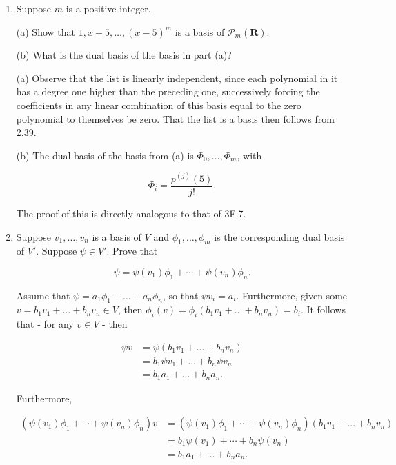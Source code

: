 \documentclass{book}
\begin{document}
\begin{enumerate}
\item Suppose \(m\) is a positive integer.

(a) Show that \(1,x-5,\dots,(x-5)^m\) is a basis of \(\mathcal{P}_m(\textbf{R})\).

(b) What is the dual basis of the basis in part (a)?

(a) Observe that the list is linearly independent, since each polynomial in it has a degree one higher than the preceding one, successively forcing the coefficients in any linear combination of this basis equal to the zero polynomial to themselves be zero.  That the list is a basis then follows from 2.39.

(b) The dual basis of the basis from (a) is \(\Phi_0,\dots,\Phi_m\), with

\begin{equation*}
    \Phi_i = \frac{p^{(j)}(5)}{j!}.
\end{equation*}

The proof of this is directly analogous to that of 3F.7.

\item Suppose \(v_1,\dots,v_n\) is a basis of \(V\) and \(\phi_1,\dots,\phi_m\) is the corresponding dual basis of \(V'\).  Suppose \(\psi \in V'\).  Prove that

\begin{equation*}
    \psi = \psi(v_1)\phi_1 + \dotsm + \psi(v_n)\phi_n.
\end{equation*}

Assume that \(\psi = a_1\phi_1 + \dots + a_n\phi_n\), so that \(\psi v_i = a_i\).  Furthermore, given some \(v = b_1v_1 + \dots + b_nv_n \in V\), then \(\phi_i(v) = \phi_i(b_1v_1 + \dots + b_nv_n) = b_i\).  It follows that - for any \(v \in V\) - then

\begin{equation*}
    \begin{split}
        \psi v &= \psi(b_1v_1 + \dots + b_nv_n) \\
        &= b_1\psi v_1 + \dots + b_n \psi v_n \\
        &= b_1a_1 + \dots + b_na_n.
    \end{split}
\end{equation*}

Furthermore,

\begin{equation*}
    \begin{split}
        \left( \psi(v_1)\phi_1 + \dotsm + \psi(v_n)\phi_n \right) v &= \left( \psi(v_1)\phi_1 + \dotsm + \psi(v_n)\phi_n \right)(b_1v_1 + \dots + b_nv_n) \\
        &= b_1\psi(v_1) + \dotsm + b_n\psi(v_n) \\
        &= b_1a_1 + \dots + b_na_n.
    \end{split}
\end{equation*}


\end{enumerate}
\end{document}
